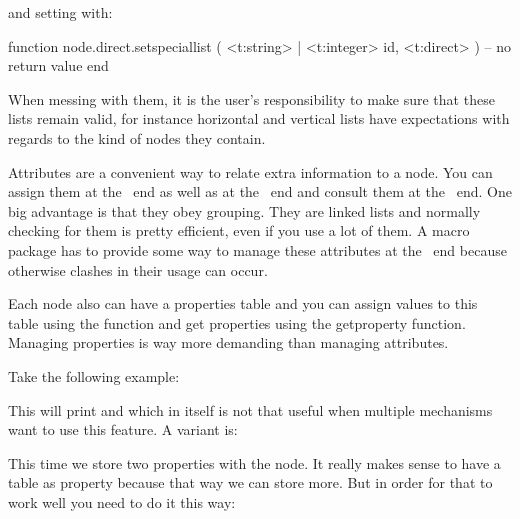 and setting with:

\starttyping[option=LUA]
function node.direct.setspeciallist (
    <t:string> | <t:integer> id,
    <t:direct>
)
    -- no return value
end
\stoptyping

When messing with them, it is the user's responsibility to make sure that these
lists remain valid, for instance horizontal and vertical lists have expectations
with regards to the kind of nodes they contain.

\stopsubsection

\startsubsection[title={Properties}]

Attributes are a convenient way to relate extra information to a node. You can
assign them at the \TEX\ end as well as at the \LUA\ end and consult them at the
\LUA\ end. One big advantage is that they obey grouping. They are linked lists
and normally checking for them is pretty efficient, even if you use a lot of
them. A macro package has to provide some way to manage these attributes at the
\TEX\ end because otherwise clashes in their usage can occur.

Each node also can have a properties table and you can assign values to this
table using the  function and get properties using the \type
{getproperty} function. Managing properties is way more demanding than managing
attributes.

Take the following example:

\starttyping
{}
\stoptyping

This will print  and  which in itself is not that useful
when multiple mechanisms want to use this feature. A variant is:

\starttyping
{}
\stoptyping

This time we store two properties with the node. It really makes sense to have a
table as property because that way we can store more. But in order for that to
work well you need to do it this way:

